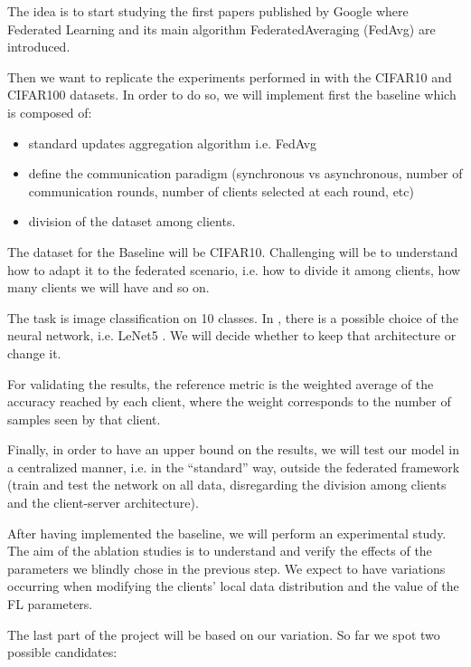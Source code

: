 \documentclass{article}
\begin{document}
The idea is to start studying the first papers published by Google \cite{DBLP:journals/corr/McMahanMRA16}\cite{pmlr-v54-mcmahan17a}
where Federated Learning and its main algorithm FederatedAveraging (FedAvg) are introduced.

Then we want to replicate the experiments performed in \cite{DBLP:journals/corr/abs-2003-08082} with the CIFAR10 and CIFAR100 datasets.
In order to do so, we will implement first the baseline which is composed of:
\begin{itemize}
    \item standard updates aggregation algorithm i.e. FedAvg
    \item define the communication paradigm (synchronous vs asynchronous, number of communication
		rounds, number of clients selected at each round, etc)
	\item division of the dataset among clients.
\end{itemize}
The dataset for the Baseline will be CIFAR10. Challenging will be to understand how to adapt it to
the federated scenario, i.e. how to divide it among clients, how many clients we will have and so on.

The task is image classification on 10 classes. In \cite{DBLP:journals/corr/abs-2003-08082}, there is a possible choice of the neural
network, i.e. LeNet5 \cite{726791}. We will decide whether to keep that architecture or change it.

For validating the results, the reference metric is the weighted average of the accuracy reached
by each client, where the weight corresponds to the number of samples seen by that client. 

Finally, in order to have an upper bound on the results, we will test our model in a
centralized manner, i.e. in the “standard” way, outside the federated framework (train and test the network on all data, disregarding the division among clients and the client-server architecture).

After having implemented the baseline, we will perform an experimental study. The aim of the ablation studies is to understand and verify the effects of the parameters we
blindly chose in the previous step. We expect to have variations occurring when modifying the clients’ local data distribution and the value of the FL parameters.

The last part of the project will be based on our variation. So far we spot two possible candidates:
\end{document}
